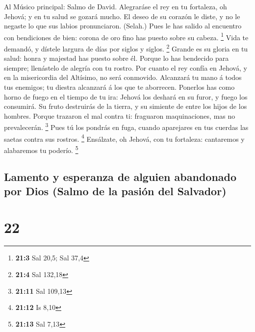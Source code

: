  Al Músico principal: Salmo de David. Alegraráse el rey en
tu fortaleza, oh Jehová; y en tu salud se gozará mucho.  El
deseo de su corazón le diste, y no le negaste lo que sus labios
pronunciaron. (Selah.)  Pues le has salido al encuentro con
bendiciones de bien: corona de oro fino has puesto sobre su cabeza.
\footnote{\textbf{21:3} Sal 20,5; Sal 37,4}  Vida te
demandó, y dístele largura de días por siglos y siglos. \footnote{\textbf{21:4}
  Sal 132,18}  Grande es su gloria en tu salud: honra y
majestad has puesto sobre él.  Porque lo has bendecido para
siempre; llenástelo de alegría con tu rostro.  Por cuanto el
rey confía en Jehová, y en la misericordia del Altísimo, no será
conmovido.  Alcanzará tu mano á todos tus enemigos; tu
diestra alcanzará á los que te aborrecen.  Ponerlos has como
horno de fuego en el tiempo de tu ira: Jehová los deshará en su furor, y
fuego los consumirá.  Su fruto destruirás de la tierra, y
su simiente de entre los hijos de los hombres.  Porque
trazaron el mal contra ti: fraguaron maquinaciones, mas no prevalecerán.
\footnote{\textbf{21:11} Sal 109,13}  Pues tú los pondrás
en fuga, cuando aparejares en tus cuerdas las saetas contra sus rostros.
\footnote{\textbf{21:12} Is 8,10}  Ensálzate, oh Jehová,
con tu fortaleza: cantaremos y alabaremos tu poderío. \footnote{\textbf{21:13}
  Sal 7,13}

\hypertarget{lamento-y-esperanza-de-alguien-abandonado-por-dios-salmo-de-la-pasiuxf3n-del-salvador}{%
\subsection{Lamento y esperanza de alguien abandonado por Dios (Salmo de
la pasión del
Salvador)}\label{lamento-y-esperanza-de-alguien-abandonado-por-dios-salmo-de-la-pasiuxf3n-del-salvador}}

\hypertarget{section-21}{%
\section{22}\label{section-21}}

